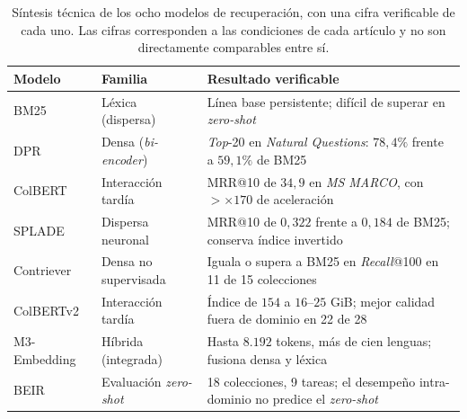 \documentclass[11pt,letterpaper]{article}
\numberwithin{equation}{section}
\begin{document}
\begin{table}[htbp]
\centering
\footnotesize
\setlength{\tabcolsep}{5pt}
\renewcommand{\arraystretch}{1.25}
\caption{Síntesis técnica de los ocho modelos de recuperación, con una cifra verificable de cada uno. Las cifras corresponden a las condiciones de cada artículo y no son directamente comparables entre sí.}
\label{tab:familias}
\begin{tabularx}{\textwidth}{@{}l l Y@{}}
\toprule
\textbf{Modelo} & \textbf{Familia} & \textbf{Resultado verificable} \\
\midrule
BM25 \cite{robertson2009bm25} & Léxica (dispersa) & Línea base persistente; difícil de superar en \textit{zero-shot} \\
DPR \cite{karpukhin2020dpr} & Densa (\textit{bi-encoder}) & \textit{Top}-20 en \textit{Natural Questions}: $78{,}4\%$ frente a $59{,}1\%$ de BM25 \\
ColBERT \cite{khattab2020colbert} & Interacción tardía & MRR@10 de $34{,}9$ en \textit{MS MARCO}, con $>{\times}170$ de aceleración \\
SPLADE \cite{formal2021splade} & Dispersa neuronal & MRR@10 de $0{,}322$ frente a $0{,}184$ de BM25; conserva índice invertido \\
Contriever \cite{izacard2022contriever} & Densa no supervisada & Iguala o supera a BM25 en \textit{Recall}@100 en 11 de 15 colecciones \\
ColBERTv2 \cite{santhanam2022colbertv2} & Interacción tardía & Índice de $154$ a $16$--$25$ GiB; mejor calidad fuera de dominio en 22 de 28 \\
M3-Embedding \cite{chen2024m3} & Híbrida (integrada) & Hasta $8.192$ tokens, más de cien lenguas; fusiona densa y léxica \\
BEIR \cite{thakur2021beir} & Evaluación \textit{zero-shot} & 18 colecciones, 9 tareas; el desempeño intra-dominio no predice el \textit{zero-shot} \\
\bottomrule
\end{tabularx}
\end{table}
\end{document}
